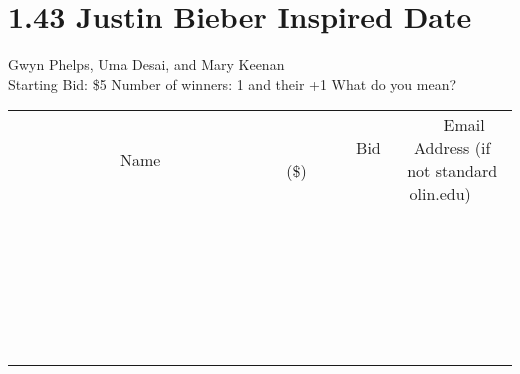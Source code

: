 \documentclass[11pt]{article}
\begin{document}
\section*{1.43 Justin Bieber Inspired Date}
Gwyn Phelps, Uma Desai, and Mary Keenan
\\
Starting Bid: \$5
\newline
Number of winners: 1 and their +1
\newline
What do you mean?
\\[6ex]
\begin{tabular}{c c c}
~~~~~~~~~~~~~Name~~~~~~~~~~~~~ & ~~~~~~~~~Bid (\$)~~~~~~~~~  & ~~~Email Address (if not standard olin.edu)~~~\\
 & & \\
\hline
 & & \\
\hline
 & & \\
\hline
 & & \\
\hline
 & & \\
\hline
 & & \\
\hline
 & & \\
\hline
 & & \\
\hline
 & & \\
\hline
 & & \\
\hline
 & & \\
\hline
 & & \\
\hline
 & & \\
\hline
 & & \\
\hline
 & & \\
\hline
 & & \\
\hline
 & & \\
\hline
 & & \\
\hline
 & & \\
\hline
 & & \\
\hline
 & & \\
\hline
 & & \\
\hline
 & & \\
\hline
 & & \\
\hline
 & & \\
\hline
 & & \\
\hline
\end{tabular}
\newpage
\end{document}
